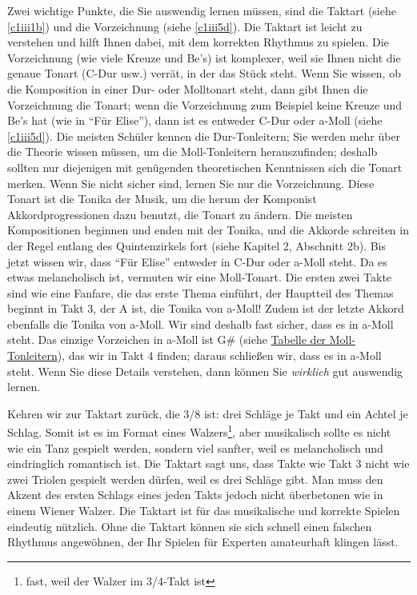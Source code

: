 Zwei wichtige Punkte, die Sie auswendig lernen müssen, sind die Taktart (siehe \hyperref[c1iii1b]{\autoref{c1iii1b}}) und die Vorzeichnung (siehe \hyperref[c1iii5d]{\autoref{c1iii5d}}).
Die Taktart ist leicht zu verstehen und hilft Ihnen dabei, mit dem korrekten Rhythmus zu spielen.
Die Vorzeichnung (wie viele Kreuze und Be's) ist komplexer, weil sie Ihnen nicht die genaue Tonart (C-Dur usw.) verrät, in der das Stück steht.
Wenn Sie wissen, ob die Komposition in einer Dur- oder Molltonart steht, dann gibt Ihnen die Vorzeichnung die Tonart; wenn die Vorzeichnung zum Beispiel keine Kreuze und Be's hat (wie in \enquote{Für Elise}), dann  ist es entweder C-Dur oder a-Moll (siehe \autoref{c1iii5d}).
Die meisten Schüler kennen die Dur-Tonleitern; Sie werden mehr über die Theorie wissen müssen, um die Moll-Tonleitern herauszufinden;
deshalb sollten nur diejenigen mit genügenden theoretischen Kenntnissen sich die Tonart merken.
Wenn Sie nicht sicher sind, lernen Sie nur die Vorzeichnung.
Diese Tonart ist die Tonika der Musik, um die herum der Komponist Akkordprogressionen dazu benutzt, die Tonart zu ändern.
Die meisten Kompositionen beginnen und enden mit der Tonika, und die Akkorde schreiten in der Regel entlang des Quintenzirkels fort (siehe Kapitel 2, Abschnitt 2b). Bis jetzt wissen wir, dass \enquote{Für Elise} entweder in C-Dur oder a-Moll steht.
Da es etwas melancholisch ist, vermuten wir eine Moll-Tonart.
Die ersten zwei Takte sind wie eine Fanfare, die das erste Thema einführt, der Hauptteil des Themas beginnt in Takt 3, der A ist, die Tonika von a-Moll!
Zudem ist der letzte Akkord ebenfalls die Tonika von a-Moll.
Wir sind deshalb fast sicher, dass es in a-Moll steht.
Das einzige Vorzeichen in a-Moll ist G\# (siehe \hyperref[tablemoll]{Tabelle der Moll-Tonleitern}), das wir in Takt 4 finden; daraus schließen wir, dass es in a-Moll steht.
Wenn Sie diese Details verstehen, dann können Sie \textit{wirklich} gut auswendig lernen.

Kehren wir zur Taktart zurück, die 3/8 ist: drei Schläge je Takt und ein Achtel je Schlag.
Somit ist es im Format eines Walzers\footnote{fast, weil der Walzer im 3/4-Takt ist}, aber musikalisch sollte es nicht wie ein Tanz gespielt werden, sondern viel sanfter, weil es melancholisch und eindringlich romantisch ist.
Die Taktart sagt uns, dass Takte wie Takt 3 nicht wie zwei Triolen gespielt werden dürfen, weil es drei Schläge gibt.
Man muss den Akzent des ersten Schlags eines jeden Takts jedoch nicht überbetonen wie in einem Wiener Walzer.
Die Taktart ist für das musikalische und korrekte Spielen eindeutig  nützlich.
Ohne die Taktart können sie sich schnell einen falschen Rhythmus angewöhnen, der Ihr Spielen für Experten amateurhaft klingen lässt.

